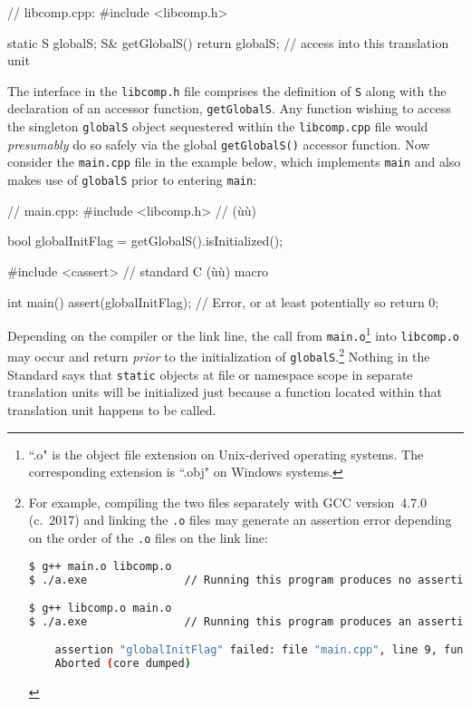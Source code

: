
\begin{emcppslisting}[emcppsbatch=e7]
// libcomp.cpp:
#include <libcomp.h>

static S globalS;
S& getGlobalS() { return globalS; }  // access into this translation unit
\end{emcppslisting}

\noindent The interface in the \lstinline!libcomp.h! file comprises the definition of
\lstinline!S! along with the declaration of an accessor function,
\lstinline!getGlobalS!. Any function wishing to access the singleton
\lstinline!globalS! object sequestered within the \lstinline!libcomp.cpp! file
would \emph{presumably} do so safely via the global
\lstinline!getGlobalS()! accessor function. Now consider the
\lstinline!main.cpp! file in the example below, which implements
\lstinline!main! and also makes use of \lstinline!globalS! prior to entering
\lstinline!main!:

\begin{emcppslisting}[emcppsbatch=e7]
// main.cpp:
#include <libcomp.h>  // (ù{}ù)

bool globalInitFlag = getGlobalS().isInitialized();

#include <cassert>  // standard C (ù{}ù) macro

int main()
{
    assert(globalInitFlag);   // Error, or at least potentially so
    return 0;
}
\end{emcppslisting}

\noindent Depending on the compiler or the link line, the call from \lstinline!main.o!\footnote{``.o" is the object file extension on Unix-derived operating systems. The corresponding extension is ``.obj" on Windows systems.} into \lstinline!libcomp.o! may occur and
return \emph{prior} to the initialization of
\lstinline!globalS!.{\cprotect\footnote{For example, compiling the two
files separately with GCC version~4.7.0 (c.~2017) and linking the
\lstinline!.o! files may generate an assertion error depending on the
order of the \lstinline!.o! files on the link line:

\begin{lstlisting}[language=bash,basicstyle={\ttfamily\footnotesize}]
$ g++ main.o libcomp.o
$ ./a.exe               // Running this program produces no assertion failure.

$ g++ libcomp.o main.o
$ ./a.exe               // Running this program produces an assertion failure.

    assertion "globalInitFlag" failed: file "main.cpp", line 9, function: int main()
    Aborted (core dumped)
\end{lstlisting}
      }} Nothing in the Standard says that \lstinline!static! objects at
file or namespace scope in separate translation units will be
initialized just because a function located within that translation unit
happens to be called.

